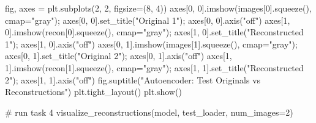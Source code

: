 \documentclass[
  letterpaper,
  DIV=11,
  numbers=noendperiod]{scrartcl}
\newenvironment{Shaded}{\begin{snugshade}}{\end{snugshade}}
\newcommand{\CommentTok}[1]{\textcolor[rgb]{0.37,0.37,0.37}{#1}}
\newcommand{\DecValTok}[1]{\textcolor[rgb]{0.68,0.00,0.00}{#1}}
\newcommand{\NormalTok}[1]{\textcolor[rgb]{0.00,0.23,0.31}{#1}}
\newcommand{\OperatorTok}[1]{\textcolor[rgb]{0.37,0.37,0.37}{#1}}
\newcommand{\StringTok}[1]{\textcolor[rgb]{0.13,0.47,0.30}{#1}}
\begin{document}
\begin{Shaded}
\begin{Highlighting}[]
\NormalTok{    fig, axes }\OperatorTok{=}\NormalTok{ plt.subplots(}\DecValTok{2}\NormalTok{, }\DecValTok{2}\NormalTok{, figsize}\OperatorTok{=}\NormalTok{(}\DecValTok{8}\NormalTok{, }\DecValTok{4}\NormalTok{))}
\NormalTok{    axes[}\DecValTok{0}\NormalTok{, }\DecValTok{0}\NormalTok{].imshow(images[}\DecValTok{0}\NormalTok{].squeeze(), cmap}\OperatorTok{=}\StringTok{"gray"}\NormalTok{)}\OperatorTok{;}\NormalTok{ axes[}\DecValTok{0}\NormalTok{, }\DecValTok{0}\NormalTok{].set\_title(}\StringTok{"Original 1"}\NormalTok{)}\OperatorTok{;}\NormalTok{ axes[}\DecValTok{0}\NormalTok{, }\DecValTok{0}\NormalTok{].axis(}\StringTok{"off"}\NormalTok{)}
\NormalTok{    axes[}\DecValTok{1}\NormalTok{, }\DecValTok{0}\NormalTok{].imshow(recon[}\DecValTok{0}\NormalTok{].squeeze(),   cmap}\OperatorTok{=}\StringTok{"gray"}\NormalTok{)}\OperatorTok{;}\NormalTok{ axes[}\DecValTok{1}\NormalTok{, }\DecValTok{0}\NormalTok{].set\_title(}\StringTok{"Reconstructed 1"}\NormalTok{)}\OperatorTok{;}\NormalTok{ axes[}\DecValTok{1}\NormalTok{, }\DecValTok{0}\NormalTok{].axis(}\StringTok{"off"}\NormalTok{)}
\NormalTok{    axes[}\DecValTok{0}\NormalTok{, }\DecValTok{1}\NormalTok{].imshow(images[}\DecValTok{1}\NormalTok{].squeeze(), cmap}\OperatorTok{=}\StringTok{"gray"}\NormalTok{)}\OperatorTok{;}\NormalTok{ axes[}\DecValTok{0}\NormalTok{, }\DecValTok{1}\NormalTok{].set\_title(}\StringTok{"Original 2"}\NormalTok{)}\OperatorTok{;}\NormalTok{ axes[}\DecValTok{0}\NormalTok{, }\DecValTok{1}\NormalTok{].axis(}\StringTok{"off"}\NormalTok{)}
\NormalTok{    axes[}\DecValTok{1}\NormalTok{, }\DecValTok{1}\NormalTok{].imshow(recon[}\DecValTok{1}\NormalTok{].squeeze(),   cmap}\OperatorTok{=}\StringTok{"gray"}\NormalTok{)}\OperatorTok{;}\NormalTok{ axes[}\DecValTok{1}\NormalTok{, }\DecValTok{1}\NormalTok{].set\_title(}\StringTok{"Reconstructed 2"}\NormalTok{)}\OperatorTok{;}\NormalTok{ axes[}\DecValTok{1}\NormalTok{, }\DecValTok{1}\NormalTok{].axis(}\StringTok{"off"}\NormalTok{)}
\NormalTok{    fig.suptitle(}\StringTok{"Autoencoder: Test Originals vs Reconstructions"}\NormalTok{)}
\NormalTok{    plt.tight\_layout()}
\NormalTok{    plt.show()}

\CommentTok{\# run task 4}
\NormalTok{visualize\_reconstructions(model, test\_loader, num\_images}\OperatorTok{=}\DecValTok{2}\NormalTok{)}

\end{Highlighting}
\end{Shaded}
\end{document}
